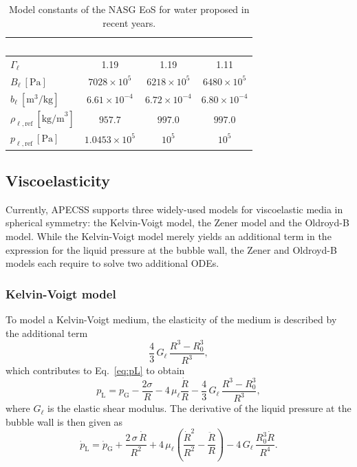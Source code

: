 \begin{table}
    \caption{Model constants of the NASG EoS for water proposed in recent years.}
    \label{tab:nasg}
    \begin{tabular}{lccc}
         & ~\citet{LeMetayer2016}~ & ~\citet{Chandran2019}~ & ~\citet{Denner2023}~\\
        \hline 
        $\Gamma_\ell$ & 1.19 & 1.19 & 1.11\\
        $B_\ell \ [\text{Pa}]$ & $7028 \times 10^5$ & $6218 \times 10^5$ & $6480 \times 10^5$ \\
        $b_\ell \ [\text{m}^3/\text{kg}]$ & $6.61 \times 10^{-4}$ & $6.72 \times 10^{-4}$ & $6.80 \times 10^{-4}$\\
        $\rho_{\ell,\text{ref}} \ [\text{kg/m}^3]$ & $957.7$ & $997.0$ & $997.0$ \\
        $p_{\ell,\text{ref}} \ [\text{Pa}]$ & $1.0453 \times 10^5$ & $10^5$ & $10^5$\\
        \hline
    \end{tabular}
\end{table}

\subsection{Viscoelasticity}

Currently, APECSS supports three widely-used models for viscoelastic media in spherical symmetry: the Kelvin-Voigt model, the Zener model and the Oldroyd-B model. While the Kelvin-Voigt model merely yields an additional term in the expression for the liquid pressure at the bubble wall, the Zener and Oldroyd-B models each require to solve two additional ODEs.

\subsubsection{Kelvin-Voigt model}

To model a Kelvin-Voigt medium, the elasticity of the medium is described by the additional term 
\begin{equation}
    \frac{4}{3} \, G_\ell \, \frac{R^3-R_0^3}{R^3}, \label{eq:KVterm}
\end{equation}
which contributes to Eq.~\eqref{eq:pL} to obtain
\begin{equation}
    p_\text{L} = p_\text{G} - \frac{2 \sigma}{R} - 4 \, \mu_\ell \frac{\dot{R}}{R} - \frac{4}{3} \, G_\ell \, \frac{R^3-R_0^3}{R^3}, \label{eq:pL_KV}
\end{equation}
where $G_\ell$ is the elastic shear modulus. The derivative of the liquid pressure at the bubble wall is then given as
\begin{equation}
    \dot{p}_\mathrm{L} = \dot{p}_\mathrm{G} + \frac{2 \, \sigma \, \dot{R}}{R^2} + 4 \, \mu_\ell \left(\frac{\dot{R}^2}{R^2} - \frac{\ddot{R}}{R}\right) - 4 \, G_\ell \, \frac{R_0^3 \dot{R}}{R^4}.
    \label{eq:dotpL_KV}
\end{equation}

